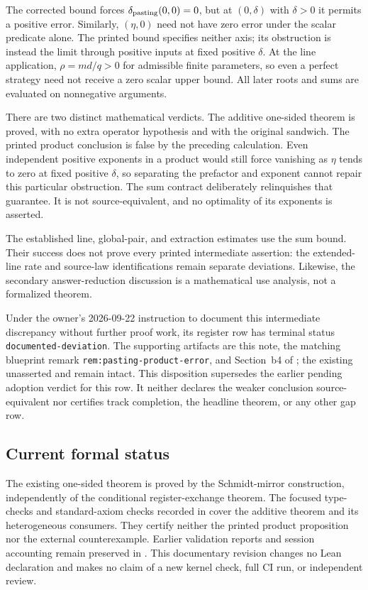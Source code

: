 \documentclass[11pt]{article}
\begin{document}
The corrected bound forces $\delta_{\rm pasting}(0,0)=0$, but at
$(0,\delta)$ with $\delta>0$ it permits a positive error. Similarly,
$(\eta,0)$ need not have zero error under the scalar predicate alone.
The printed bound specifies neither axis; its obstruction is instead the
limit through positive inputs at fixed positive $\delta$.
At the line application, $\rho=md/q>0$ for admissible finite parameters,
so even a perfect strategy need not receive a zero scalar upper bound.
All later roots and sums are evaluated on nonnegative arguments.

There are two distinct mathematical verdicts. The additive one-sided theorem
is proved, with no extra operator hypothesis and with the original sandwich.
The printed product conclusion is false by the preceding calculation. Even
independent positive exponents in a product would still force vanishing as
$\eta$ tends to zero at fixed positive $\delta$, so separating the prefactor
and exponent cannot repair this particular obstruction. The sum contract
deliberately relinquishes that guarantee. It is not source-equivalent, and
no optimality of its exponents is asserted.

The established line, global-pair, and extraction estimates use the sum
bound. Their success does not prove every printed intermediate assertion:
the extended-line rate and source-law identifications remain separate
deviations. Likewise, the secondary answer-reduction discussion is a
mathematical use analysis, not a formalized theorem.

Under the owner's 2026-09-22 instruction to document this intermediate
discrepancy without further proof work, its register row has terminal status
\texttt{documented-deviation}. The supporting artifacts are this note,
the matching blueprint remark \texttt{rem:pasting-product-error}, and
Section~b4 of ; the existing unasserted
 and  remain
intact. This disposition supersedes the earlier pending adoption verdict
for this row. It neither declares the weaker conclusion source-equivalent
nor certifies track completion, the headline theorem, or any other gap row.

\subsection*{Current formal status}

The existing one-sided theorem  is proved by
the Schmidt-mirror construction, independently of the conditional
register-exchange theorem. The focused type-checks and standard-axiom checks
recorded in  cover the
additive theorem and its heterogeneous consumers. They certify neither the
printed product proposition nor the external counterexample. Earlier
validation reports and session accounting remain preserved in
. This documentary
revision changes no Lean declaration and makes no claim of a new kernel
check, full CI run, or independent review.
\end{document}
